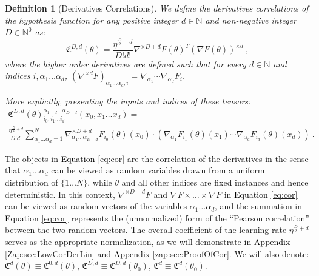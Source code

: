 \documentclass{article} %
\newtheorem{definition}{Definition}[section]
\begin{document}
\begin{definition}[Derivatives Correlations]
\label{def:cor1}
\textup{We define the derivatives correlations of the hypothesis function for any positive integer $d\in\mathbb{N}$ and non-negative integer \(D\in\mathbb{N}^0\) as:
\begin{equation}
\mathfrak{C}^{D,d}\left(\theta\right)=\frac{\eta^{\frac{D}{2}+d}}{D!d!}\nabla^{\times D+d}F\left(\theta\right)^T\left(\nabla F\left(\theta\right)\right)^{\times d} \ ,
\label{eq:cor}
\end{equation}
where the higher order derivatives \textcolor{black}{are} defined such that for every $d\in\mathbb{N}$ and indices $i,\alpha_{1}\ldots\alpha_{d}$, 
$\left(\nabla^{\times d}F\right)_{\alpha_{1}\ldots\alpha_{d},i}=\nabla_{\alpha_{1}}\cdots\nabla_{\alpha_{d}}F_{i}$.}

\textup
{More explicitly, presenting the inputs and indices of these tensors:
\begin{equation}
\begin{array}{c}
\mathfrak{C}^{D,d}\left(\theta\right)_{i_{0},i_{1}\ldots i_{d}}^{\alpha_{1+d}\ldots\alpha_{D+d}}\left(x_{0},x_{1}\ldots x_{d}\right)=\\
\frac{\eta^{\frac{D}{2}+d}}{D!d!}\sum_{\alpha_{1}\ldots\alpha_{d}=1}^{N}\nabla_{\alpha_{1}\ldots\alpha_{D+d}}^{\times D+d}F_{i_{0}}\left(\theta\right)\left(x_{0}\right)\cdot
\left(\nabla_{\alpha_{1}}F_{i_{1}}\left(\theta\right)\left(x_{1}\right)\cdots\nabla_{\alpha_{d}}F_{i_{d}}\left(\theta\right)\left(x_{d}\right)\right)\ .
\end{array}
\label{eq:Cor}
\end{equation}
}
\end{definition}

The objects in \textcolor{black}{Equation} \ref{eq:cor} are the correlation of the derivatives in the sense that \(\alpha_{1}\ldots\alpha_{d}\) can be viewed as random variables drawn from a uniform distribution of $\{1\ldots N\}$, while \(\theta\) and all other indices are fixed instances and hence deterministic. In this context, \(\nabla^{\times D+d}F\) and \(\nabla F\times\ldots\times\nabla F\) in \textcolor{black}{Equation} \ref{eq:cor} can be viewed as random vectors of the variables \(\alpha_{1}\ldots\alpha_{d}\), and the summation in \textcolor{black}{Equation} \ref{eq:cor} represents the (unnormalized) form of the ``Pearson correlation'' between the two random vectors. The overall coefficient of the learning rate \(\eta^{\frac{D}{2}+d}\) serves as the appropriate normalization, as we will demonstrate in \textcolor{black}{Appendix} \ref{Zap:sec:LowCorDerLin} and \textcolor{black}{Appendix} \ref{zap:sec:ProofOfCor}. We will also denote: $\mathfrak{C}^{d}\left(\theta\right)\equiv\mathfrak{C}^{0,d}\left(\theta\right)$, $\mathfrak{C}^{D,d}\equiv\mathfrak{C}^{D,d}\left(\theta_{0}\right)$, $\mathfrak{C}^{d}\equiv\mathfrak{C}^{d}\left(\theta_{0}\right)$. 
\end{document}
